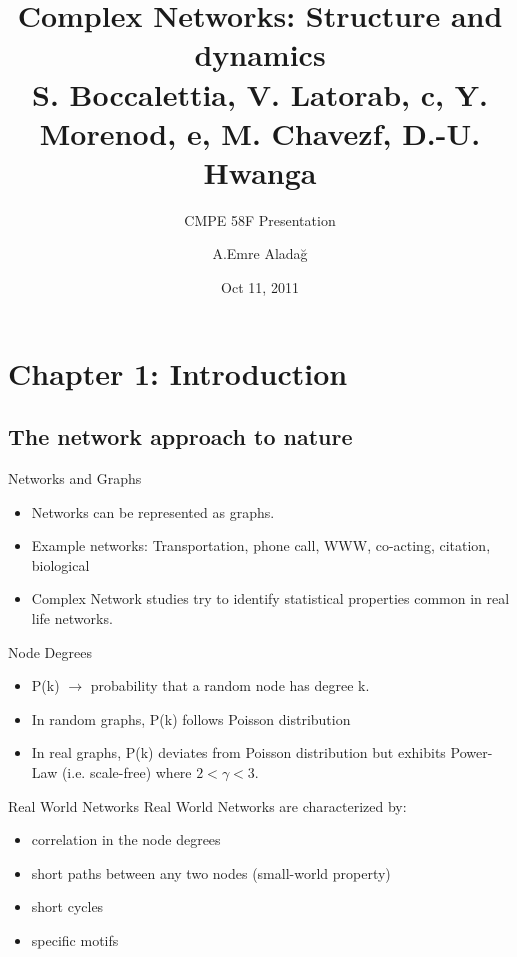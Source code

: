\documentclass{beamer}
\title{Complex Networks: Structure and dynamics\\\small{S. Boccalettia, V. Latorab, c, Y. Morenod, e, M. Chavezf, D.-U. Hwanga}}
\subtitle{CMPE 58F Presentation}
\author{A.Emre Aladağ}
\institute{Boğaziçi University}
\date{ Oct 11, 2011}
\begin{document}
\frame{
	\titlepage
}

\section[Outline]{}
\frame{\tableofcontents}

\section{Chapter 1: Introduction}
\subsection{The network approach to nature}
\begin{frame}{Networks and Graphs}
\begin{itemize}
 \item Networks can be represented as graphs.
 \item Example networks: Transportation, phone call, WWW, co-acting, citation, biological
 \item Complex Network studies try to identify statistical properties common in real life networks.
\end{itemize}
\end{frame}


\begin{frame}{Node Degrees}
\begin{itemize}
 \item P(k) $\rightarrow$ probability that a random node has degree k.
 \item In random graphs, P(k) follows Poisson distribution
 \item In real graphs, P(k) deviates from Poisson distribution but exhibits Power-Law (i.e. scale-free) where $2<\gamma<3$.
\end{itemize}
\end{frame}

\begin{frame}{Real World Networks}
Real World Networks are characterized by:
\begin{itemize}
 \item correlation in the node degrees
 \item short paths between any two nodes (small-world property)
 \item short cycles
 \item specific motifs
\end{itemize}
\end{frame}
\end{document}
